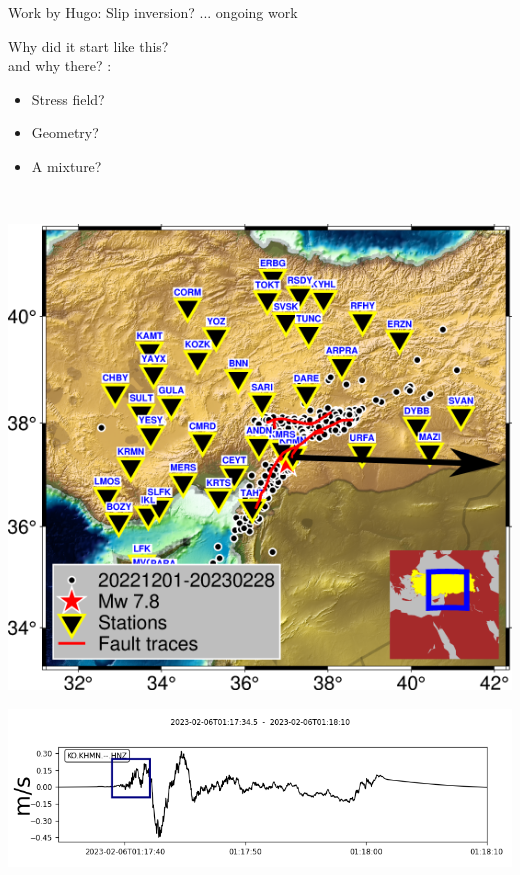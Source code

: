 \documentclass{beamer}
\begin{document}
\begin{frame}
 {Work by Hugo: Slip inversion? ... ongoing work}
 
 \vskip -0.5cm \begin{minipage}{0.51\linewidth}
  \hskip -0.8cm
\end{minipage} 
\begin{minipage}{0.47\linewidth}
\vskip 0.7cm Why did it start like this? \\ and why there? :
\vskip 0.1cm
\begin{itemize}
 \item Stress field?
 \item Geometry?
 \item A mixture?
\end{itemize}
\end{minipage} \\ \vskip 0.2cm 
\begin{minipage}{0.45\linewidth}
 \includegraphics[width=1\linewidth]{images/Map2.png}
\end{minipage}
\begin{minipage}{0.45\linewidth}
 \includegraphics[width=1.4\linewidth]{images/p1z.png}
\end{minipage}
 
\end{frame}
\end{document}
